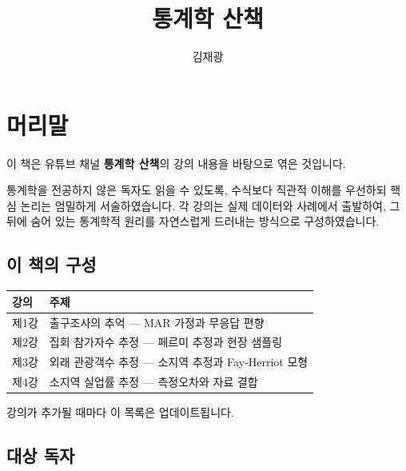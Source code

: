 \documentclass[
  letterpaper,
  DIV=11,
  numbers=noendperiod]{scrreprt}
\title{통계학 산책}
\author{김재광}
\date{}
\newcounter{none} %
\renewcommand*\contentsname{Table of contents}
\newcommand\contentsname{Table of contents}
\begin{document}
\maketitle

\renewcommand*\contentsname{Table of contents}
{
\setcounter{tocdepth}{2}
\tableofcontents
}


\chapter*{머리말}\label{uxba38uxb9acuxb9d0}


이 책은 유튜브 채널 \textbf{통계학 산책}의 강의 내용을 바탕으로 엮은
것입니다.

통계학을 전공하지 않은 독자도 읽을 수 있도록, 수식보다 직관적 이해를
우선하되 핵심 논리는 엄밀하게 서술하였습니다. 각 강의는 실제 데이터와
사례에서 출발하여, 그 뒤에 숨어 있는 통계학적 원리를 자연스럽게 드러내는
방식으로 구성하였습니다.

\section*{이 책의 구성}\label{uxc774-uxcc45uxc758-uxad6cuxc131}


{\def\LTcaptype{none} %
\begin{longtable}[]{@{}ll@{}}
\toprule\noalign{}
강의 & 주제 \\
\midrule\noalign{}
\endhead
\bottomrule\noalign{}
\endlastfoot
제1강 & 출구조사의 추억 --- MAR 가정과 무응답 편향 \\
제2강 & 집회 참가자수 추정 --- 페르미 추정과 현장 샘플링 \\
제3강 & 외래 관광객수 추정 --- 소지역 추정과 Fay-Herriot 모형 \\
제4강 & 소지역 실업률 추정 --- 측정오차와 자료 결합 \\
\end{longtable}
}

강의가 추가될 때마다 이 목록은 업데이트됩니다.

\section*{대상 독자}\label{uxb300uxc0c1-uxb3c5uxc790}
\end{document}
